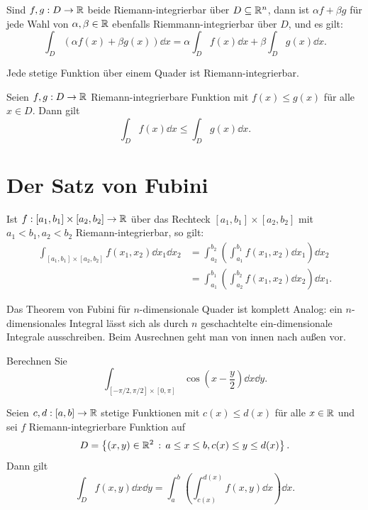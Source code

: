 \begin{thm}
	Sind $f, g: D \to \mathbb{R}$ beide Riemann-integrierbar über $D \subseteq \mathbb{R}^n$, dann ist $\alpha f + \beta g$ für jede Wahl von $\alpha, \beta \in \mathbb{R}$ ebenfalls Riemmann-integrierbar über $D$, und es gilt: 
	\[
		\int_D (\alpha f(x) + \beta g(x) ) \dd x = \alpha \int_D f(x) \dd x + \beta \int_D g(x) \dd x. 
	\]
\end{thm} 

\begin{thm} 
	Jede stetige Funktion über einem Quader ist Riemann-integrierbar. 
\end{thm}

\begin{thm}
	Seien $f, g: D \to \mathbb{R}$ Riemann-integrierbare Funktion mit $f(x) \le g(x)$ für alle $x \in D$. Dann gilt 
	\[
		\int_D f(x) \dd x \le \int_D g(x) \dd x.
	\]
\end{thm} 

\section{Der Satz von Fubini}

\begin{thm}
	Ist $f : [a_1, b_1] \times [a_2, b_2] \to \mathbb{R}$ über das Rechteck $[a_1, b_1] \times [a_2,b_2]$ mit $a_1< b_1, a_2 < b_2$ Riemann-integrierbar, so gilt:
	\begin{align*}
		\int_{[a_1,b_1] \times [a_2,b_2]} f(x_1, x_2) \dd x_1 \dd x_2 & = \int_{a_2}^{b_2} \left( \int_{a_1}^{b_1}  f(x_1, x_2) \dd x_1 \right) \dd x_2 
		\\ & = \int_{a_1}^{b_1} \left( \int_{a_2}^{b_2}  f(x_1, x_2) \dd x_2 \right) \dd x_1.
	\end{align*}
\end{thm} 

\begin{bem} 
	Das Theorem von Fubini für $n$-dimensionale Quader ist komplett Analog: ein $n$-dimensionales Integral lässt sich als durch $n$ geschachtelte ein-dimensionale Integrale ausschreiben. Beim Ausrechnen geht man von innen nach außen vor. 
\end{bem} 

\begin{aufg}
	Berechnen Sie 
	\[
		\int_{[-\pi/2,\pi/2] \times [0,\pi]} \cos \left(x-\frac{y}{2} \right) \dd x \dd y.
	\]
\end{aufg} 

\begin{thm} 
	Seien $c, d: [a,b] \to \mathbb{R}$ stetige Funktionen mit $c(x) \le d(x)$ für alle $x \in \mathbb{R}$ und sei $ f$ Riemann-integrierbare Funktion auf 
	\[
		D = \left\{  (x,y) \in \mathbb{R}^2 \,:\, a \le x \le b, c(x) \le y \le d(x) \right\}. 
	\]
	Dann gilt 
	\[
		\int_D f(x,y) \dd x \dd y = \int_a^b \left( \int_{c(x)}^{d(x)} f(x,y) \dd x \right) \dd x.
	\]
\end{thm} 

